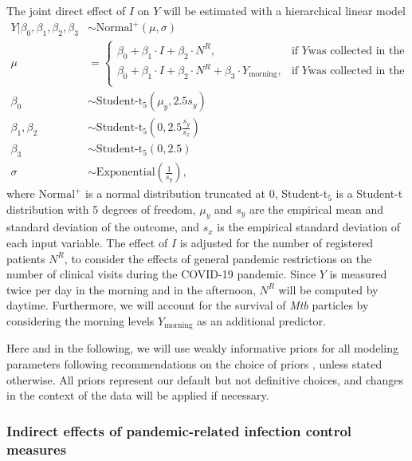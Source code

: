 \documentclass{article}
\begin{document}
The joint direct effect of $I$ on $Y$ will be estimated with a hierarchical linear model
\begin{align*}
    Y | \beta_0, \beta_1, \beta_2, \beta_3 &\sim \text{Normal}^{+}(\mu, \sigma) \\
    \mu &= 
        \begin{cases}
            \beta_0 + \beta_1 \cdot I + \beta_2 \cdot N^R , & \text{if } Y \text{was collected in the morning} \\
            \beta_0 + \beta_1 \cdot I + \beta_2 \cdot N^R + \beta_3 \cdot Y_{\text{morning}}, & \text{if } Y \text{was collected in the afternoon} \\
        \end{cases} \\
    \beta_0 &\sim \text{Student-t}_5(\mu_y, 2.5s_{y}) \\
    \beta_1, \beta_2 &\sim \text{Student-t}_5\left(0, 2.5\frac{s_{y}}{s_{x}}\right) \\
    \beta_3 &\sim \text{Student-t}_5\left(0, 2.5\right) \\
    \sigma &\sim \text{Exponential}\left(\frac{1}{s_{y}}\right),
\end{align*}
where $\text{Normal}^{+}$ is a normal distribution truncated at $0$, Student-t$_5$ is a Student-t distribution with 5 degrees of freedom, $\mu_{y}$ and $s_{y}$ are the empirical mean and standard deviation of the outcome, and $s_x$ is the empirical standard deviation of each input variable. The effect of $I$ is adjusted for the number of registered patients $N^R$, to consider the effects of general pandemic restrictions on the number of clinical visits during the COVID-19 pandemic. Since $Y$ is measured twice per day in the morning and in the afternoon, $N^R$ will be computed by daytime. Furthermore, we will account for the survival of \emph{Mtb} particles by considering the morning levels $Y_{\text{morning}}$ as an additional predictor. 

Here and in the following, we will use weakly informative priors for all modeling parameters following recommendations on the choice of priors \cite{Gelman2008AAS,Gelman2008StatMed,Gelman2020RegOther,Stan2022,Gabry2023Priors}, unless stated otherwise. All priors represent our default but not definitive choices, and changes in the context of the data will be applied if necessary.

\subsubsection*{Indirect effects of pandemic-related infection control measures}
\end{document}
